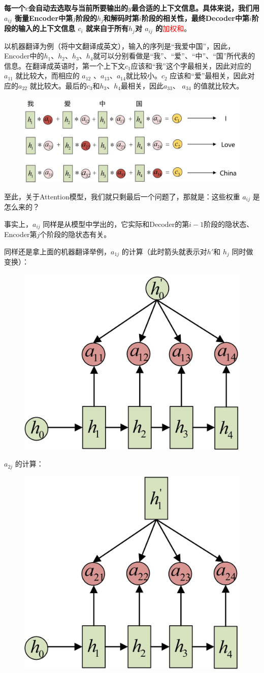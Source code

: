 \documentclass[12pt]{article}
\begin{document}
\textbf{每一个$c$会自动去选取与当前所要输出的$y$最合适的上下文信息。具体来说，我们用 $a_{ij}$ 衡量Encoder中第$j$阶段的$h_j$和解码时第$i$阶段的相关性，最终Decoder中第$i$阶段的输入的上下文信息 $c_i$ 就来自于所有$h_j$对 $a_{ij}$ 的}\textcolor{red}{加权和}。

以机器翻译为例（将中文翻译成英文），输入的序列是“我爱中国”，因此，Encoder中的$h_1$、$h_2$、$h_3$、$h_4$就可以分别看做是“我”、“爱”、“中”、“国”所代表的信息。在翻译成英语时，第一个上下文$c_1$应该和“我”这个字最相关，因此对应的 $a_{11}$ 就比较大，而相应的 $a_{12}$ 、$a_{13}$、$a_{14}$就比较小。$c_2$ 应该和“爱”最相关，因此对应的$a_{22}$ 就比较大。最后的$c_3$和$h_3$、$h_4$最相关，因此$a_{33}$、 $a_{34}$ 的值就比较大。
\begin{figure}[H]
    \centering
    \includegraphics[width=.8\textwidth]{fig/Attention_Example.jpg}
\end{figure}

至此，关于Attention模型，我们就只剩最后一个问题了，那就是：这些权重 $a_{ij}$ 是怎么来的？

事实上，$a_{ij}$ 同样是从模型中学出的，它实际和Decoder的第$i-1$阶段的隐状态、Encoder第$j$个阶段的隐状态有关。

同样还是拿上面的机器翻译举例，$a_{1j}$ 的计算（此时箭头就表示对$h'$和 $h_j$ 同时做变换）：
\begin{figure}[H]
    \centering
    \includegraphics[width=.4\textwidth]{fig/Attention_Compute_A_1.jpg}
\end{figure}

$a_{2j}$ 的计算：
\begin{figure}[H]
    \centering
    \includegraphics[width=.4\textwidth]{fig/Attention_Compute_A_2.jpg}
\end{figure}
\end{document}
